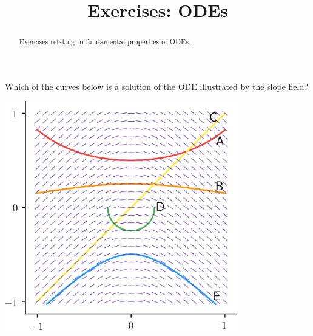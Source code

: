 \documentclass{ximera}
\title{Exercises: ODEs}
\begin{document}
\begin{abstract}
Exercises relating to fundamental properties of ODEs.
\end{abstract}
\maketitle

\begin{exercise}
Which of the curves below is a solution of the ODE illustrated by the slope field?
\begin{center}\begin{image}
\includegraphics[width=4in]{images/slope01.png}
\end{image}\end{center}
\begin{multipleChoice}
\end{multipleChoice}
\end{exercise}
\end{document}
